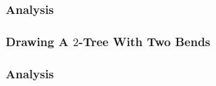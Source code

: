 \subsubsection{Analysis}

\subsubsection{Drawing A $2$-Tree With Two Bends}

\subsubsection{Analysis}



